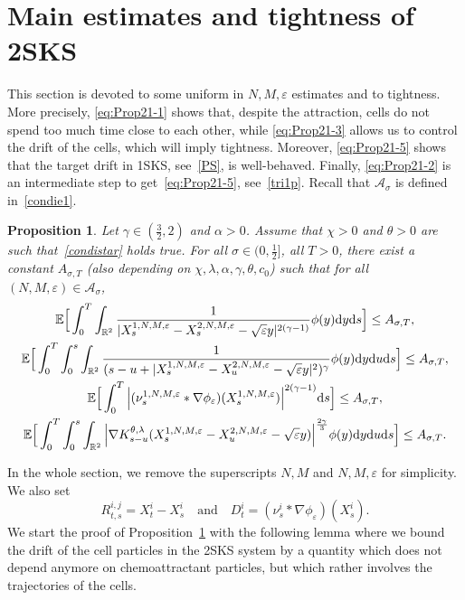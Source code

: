 \documentclass[11pt]{article}
\newtheorem{proposition}[theorem]{Proposition}
\newcommand{\E}{\mathbb{E}}
\newcommand{\R}{\mathbb{R}}
\newcommand{\1}{\mathbbm{1}}
\newcommand{\dd}{{\rm d}}
\newcommand{\Aa}{\mathcal A}
\newcommand{\e}{\varepsilon}
\begin{document}
\section{Main estimates and tightness of 2SKS}
\label{meat}

This section is devoted to some uniform in $N,M,\e$ estimates and to tightness.
More precisely, \eqref{eq:Prop21-1} shows that, despite the attraction,
cells do not spend too much time close to each other, while \eqref{eq:Prop21-3}
allows us to control the drift of the cells, which will imply tightness. Moreover,
\eqref{eq:Prop21-5} shows that the target drift in 1SKS, see~\eqref{PS}, is well-behaved.
Finally, \eqref{eq:Prop21-2} is an intermediate step to get~\eqref{eq:Prop21-5}, see~\eqref{tri1p}.
Recall that $\Aa_\sigma$ is defined in~\eqref{condie1}.

\begin{proposition}\label{prop:mc}
Let $\gamma \in (\frac 32,2)$ and $\alpha>0$. Assume that $\chi>0$ and 
$\theta>0$ are such that~\eqref{condistar} holds true.
For all $\sigma\in (0,\frac12]$, all $T>0$, there exist a constant $A_{\sigma,T}$  
(also depending on $\chi,\lambda,\alpha,\gamma,\theta,c_0$) such that for all $(N,M,\e)\in \Aa_\sigma$,
\begin{gather}
\E \Big[\int_0^T \int_{\R^2} \frac{1}{|X_s^{1,N,M,\e}-X_s^{2,N,M,\e}-\sqrt\e y|^{2(\gamma-1)}} \phi(y)\dd y\dd s\Big ]\leq A_{\sigma,T},
\label{eq:Prop21-1}\\
\E \Big[\int_0^T  \int_0^s \int_{\R^2}\frac{1}{(s-u+ |X_s^{1,N,M,\e}-X_u^{2,N,M,\e}-\sqrt\e y|^{2})^\gamma} \phi(y) \dd y 
\dd u \dd s \Big ]\leq A_{\sigma,T}, \label{eq:Prop21-2} \\
\E \Big[\int_0^T \Big|(\nu^{1,N,M,\e}_s \ast \nabla \phi_{\e})(X^{1,N,M,\e}_s)\Big|^{2(\gamma-1)}\dd s
\Big]\leq A_{\sigma,T}, \label{eq:Prop21-3}\\
\E \Big[\int_0^T  \int_0^s \int_{\R^2}
\Big|\nabla K^{\theta,\lambda}_{s-u}(X_s^{1,N,M,\e}-X_u^{2,N,M,\e}-\sqrt\e y)\Big|^{\frac{2\gamma}3} \phi(y)\dd y
\dd u \dd s \Big ]\leq A_{\sigma,T}. \label{eq:Prop21-5}
\end{gather}
\end{proposition}


In the whole section, we remove the superscripts $N,M$ and $N,M,\e$ for simplicity.
We also set
$$
R^{i,j}_{t,s}=X^i_t-X^i_s \quad \text{and}  \quad D^i_t=(\nu^{i}_s \ast \nabla \phi_{\e})(X^{i}_s).
$$
We start the proof of Proposition~\ref{prop:mc} with the following lemma where we bound the drift of the cell particles in the 2SKS system by a quantity which does not depend anymore on chemoattractant particles, but which rather involves the trajectories of the cells.
\end{document}
